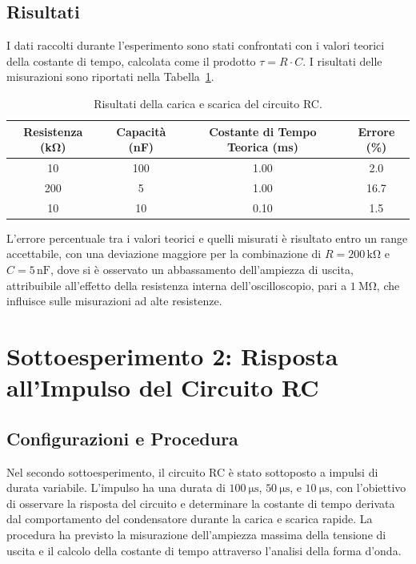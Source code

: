\documentclass[a4paper,12pt]{article}
\begin{document}
\subsection{Risultati}
I dati raccolti durante l'esperimento sono stati confrontati con i valori teorici della costante di tempo, calcolata come il prodotto \( \tau = R \cdot C \). I risultati delle misurazioni sono riportati nella Tabella~\ref{tab:rc_charge_discharge}.

\begin{table}[H]
\centering
\begin{tabular}{|c|c|c|c|}
\hline
\textbf{Resistenza (\si{\kilo\ohm})} & \textbf{Capacità (\si{\nano\farad})} & \textbf{Costante di Tempo Teorica (\si{\milli\second})} & \textbf{Errore (\%)} \\ \hline
10 & 100 & 1.00 & 2.0 \\ \hline
200 & 5 & 1.00 & 16.7 \\ \hline
10 & 10 & 0.10 & 1.5 \\ \hline
\end{tabular}
\caption{Risultati della carica e scarica del circuito RC.}
\label{tab:rc_charge_discharge}
\end{table}

L'errore percentuale tra i valori teorici e quelli misurati è risultato entro un range accettabile, con una deviazione maggiore per la combinazione di \( R = 200 \, \mathrm{k\Omega} \) e \( C = 5 \, \mathrm{nF} \), dove si è osservato un abbassamento dell'ampiezza di uscita, attribuibile all'effetto della resistenza interna dell'oscilloscopio, pari a \(\SI{1}{\mega\ohm}\), che influisce sulle misurazioni ad alte resistenze.


\section{Sottoesperimento 2: Risposta all'Impulso del Circuito RC}
\subsection{Configurazioni e Procedura}
Nel secondo sottoesperimento, il circuito RC è stato sottoposto a impulsi di durata variabile. L'impulso ha una durata di \(\SI{100}{\micro\second}\), \(\SI{50}{\micro\second}\), e \(\SI{10}{\micro\second}\), con l'obiettivo di osservare la risposta del circuito e determinare la costante di tempo derivata dal comportamento del condensatore durante la carica e scarica rapide. La procedura ha previsto la misurazione dell'ampiezza massima della tensione di uscita e il calcolo della costante di tempo attraverso l'analisi della forma d'onda.
\end{document}
